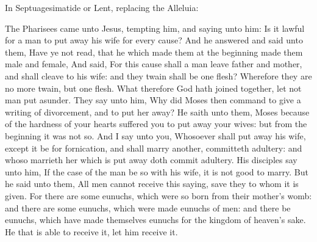 
\begin{rubric}
{In Septuagesimatide or Lent, replacing the Alleluia:}
\end{rubric}\par\noindent


 The Pharisees came unto Jesus, tempting him, and saying unto him: Is it lawful for a man to put away his wife for every cause? And he answered and said unto them, Have ye not read, that he which made them at the beginning made them male and female, And said, For this cause shall a man leave father and mother, and shall cleave to his wife: and they twain shall be one flesh? Wherefore they are no more twain, but one flesh. What therefore God hath joined together, let not man put asunder. They say unto him, Why did Moses then command to give a writing of divorcement, and to put her away? He saith unto them, Moses because of the hardness of your hearts suffered you to put away your wives: but from the beginning it was not so. And I say unto you, Whosoever shall put away his wife, except it be for fornication, and shall marry another, committeth adultery: and whoso marrieth her which is put away doth commit adultery. His disciples say unto him, If the case of the man be so with his wife, it is not good to marry. But he said unto them, All men cannot receive this saying, save they to whom it is given. For there are some eunuchs, which were so born from their mother's womb: and there are some eunuchs, which were made eunuchs of men: and there be eunuchs, which have made themselves eunuchs for the kingdom of heaven's sake. He that is able to receive it, let him receive it.


